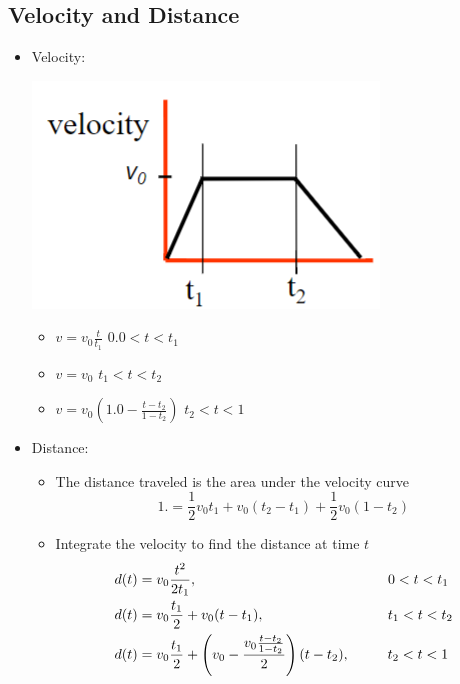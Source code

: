 \documentclass{article}
\begin{document}
\subsection*{Velocity and Distance}
\begin{itemize}
    \item Velocity:
    \begin{center}
        \includegraphics*[scale=0.8]{W4_9.png}
    \end{center}
    \begin{itemize}
        \item $v = v_0 \frac{t}{t_1}$               $0.0 < t < t_1$
        \item $v = v_0$                          $t_1 < t < t_2$
        \item $v = v_0 (1.0 - \frac{t - t_2}{1 - t_2})$                $t_2 < t < 1$
    \end{itemize}
    \item Distance:
    \begin{itemize}
        \item The distance traveled is the area under the velocity curve
        \[1. = \frac{1}{2} v_0 t_1 + v_0 (t_2 - t_1) + \frac{1}{2} v_0 (1 - t_2)\]
        \item Integrate the velocity to find the distance at time $t$
        \begin{align*}
            d(t) &= v_0 \frac{t^2}{2t_1},\hspace{4.8cm} 0 < t < t_1\\
            d(t) &= v_0 \frac{t_1}{2} + v_0(t - t_1), \hspace{3.1cm} t_1 < t < t_2\\
            d(t) &= v_0 \frac{t_1}{2} + \left(v_0 - \frac{v_0 \frac{t - t_2}{1 - t_2}}{2}\right)(t - t_2), \hspace{0.95cm} t_2 < t < 1
        \end{align*}
    \end{itemize}
\end{itemize}
\end{document}
